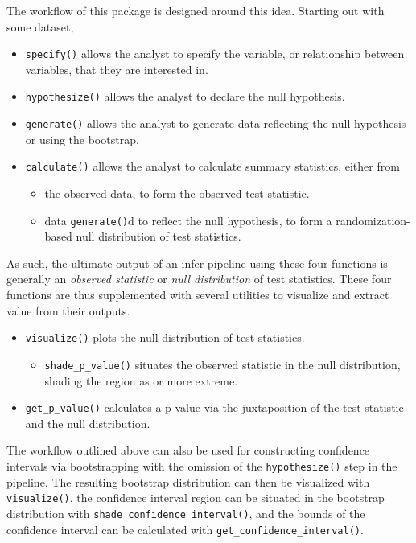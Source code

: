 \documentclass[10pt,a4paper,onecolumn]{article}
\providecommand{\tightlist}{%
  \setlength{\itemsep}{0pt}\setlength{\parskip}{0pt}}
\begin{document}
The workflow of this package is designed around this idea. Starting out
with some dataset,

\begin{itemize}
\tightlist
\item
  \texttt{specify()} allows the analyst to specify the variable, or
  relationship between variables, that they are interested in.
\item
  \texttt{hypothesize()} allows the analyst to declare the null
  hypothesis.
\item
  \texttt{generate()} allows the analyst to generate data reflecting the
  null hypothesis or using the bootstrap.
\item
  \texttt{calculate()} allows the analyst to calculate summary
  statistics, either from

  \begin{itemize}
  \tightlist
  \item
    the observed data, to form the observed test statistic.
  \item
    data \texttt{generate()}d to reflect the null hypothesis, to form a
    randomization-based null distribution of test statistics.
  \end{itemize}
\end{itemize}

As such, the ultimate output of an infer pipeline using these four
functions is generally an \emph{observed statistic} or \emph{null
distribution} of test statistics. These four functions are thus
supplemented with several utilities to visualize and extract value from
their outputs.

\begin{itemize}
\tightlist
\item
  \texttt{visualize()} plots the null distribution of test statistics.

  \begin{itemize}
  \tightlist
  \item
    \texttt{shade\_p\_value()} situates the observed statistic in the
    null distribution, shading the region as or more extreme.
  \end{itemize}
\item
  \texttt{get\_p\_value()} calculates a p-value via the juxtaposition of
  the test statistic and the null distribution.
\end{itemize}

The workflow outlined above can also be used for constructing confidence
intervals via bootstrapping with the omission of the
\texttt{hypothesize()} step in the pipeline. The resulting bootstrap
distribution can then be visualized with \texttt{visualize()}, the
confidence interval region can be situated in the bootstrap distribution
with \texttt{shade\_confidence\_interval()}, and the bounds of the
confidence interval can be calculated with
\texttt{get\_confidence\_interval()}.
\end{document}
